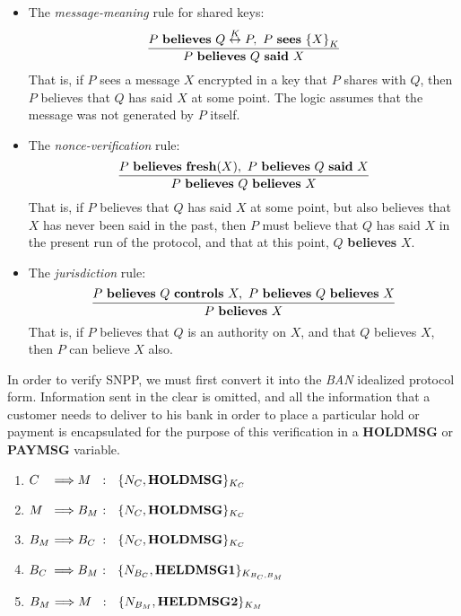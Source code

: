 \begin{itemize}
\item The {\em message-meaning} rule for shared keys:
\[\frac{P {\bf \ believes\ } Q \stackrel{K}{\leftrightarrow} P,\  P
{\bf \ sees\ }
{\{X\}}_K}{P {\bf \ believes\ } Q {\bf \ said\ } X}\]
That is, if $P$ sees a message $X$ encrypted in a key that $P$ shares with $Q$,
then $P$ believes that $Q$ has said $X$ at some point.  The logic assumes
that the message was not generated by $P$ itself.

\item The {\em nonce-verification} rule:
\[\frac{P {\bf \ believes\ fresh}(X),\ P\ {\bf believes}\ Q\ {\bf said}\ X}
{P\ {\bf believes}\ Q\ {\bf believes}\ X}\]
That is, if $P$ believes that $Q$ has said $X$ at some point, but also
believes that
$X$ has never been said in the past, then $P$ must believe that $Q$ has
said $X$ in the present run of the protocol, and that at this point,
$Q$ {\bf believes} $X$.

\item The {\em jurisdiction} rule:
\[\frac{P\ {\bf believes}\ Q\ {\bf controls}\ X,\
	P\ {\bf believes}\ Q\ {\bf believes}\ X}
       {P\ {\bf believes}\ X}\]
That is, if $P$ believes that $Q$ is an authority on $X$, and that $Q$
believes $X$, then $P$ can believe $X$ also.
\end{itemize}

In order to verify SNPP, we must first convert it into the {\em BAN}
idealized protocol form.  Information sent in the clear is omitted, and all
the information that a customer needs to deliver to his bank in order to
place a particular hold or payment is encapsulated for the purpose of this
verification in a {\bf HOLDMSG} or {\bf PAYMSG} variable.

\begin{enumerate}
\item  $\makebox[.6cm][l]{$C$} \Longrightarrow \makebox[.6cm][l]{$M$} :\ \
		\{N_{C},{\bf HOLDMSG}\}_{K_{C}} $
\item  $ \makebox[.6cm][l]{$M$} \Longrightarrow \makebox[.6cm][l]{$B_{M}$}
	:\ \ \{N_{C},{\bf HOLDMSG}\}_{K_{C}} $
\item  $ \makebox[.6cm][l]{$B_{M}$} \Longrightarrow
		\makebox[.6cm][l]{$B_{C}$} :\ \ \{N_{C},{\bf	HOLDMSG}\}_{K_{C}} $
\item  $ \makebox[.6cm][l]{$B_{C}$} \Longrightarrow
	\makebox[.6cm][l]{$B_{M}$} :\ \ \{N_{B_{C}},{\bf HELDMSG1}\}_{K_{B_{C},B_{M}}} $
\item  $ \makebox[.6cm][l]{$B_{M}$} \Longrightarrow \makebox[.6cm][l]{$M$}
			:\ \ \{N_{B_{M}},{\bf HELDMSG2}\}_{K_{M}} $

\end{enumerate}

